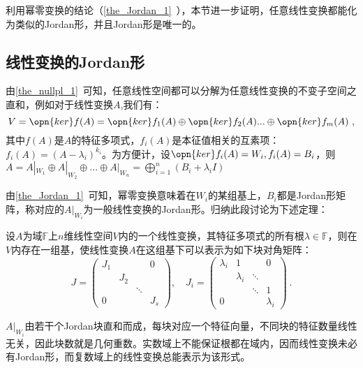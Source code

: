

\begin{issues}
\issueTODO
\end{issues}

利用幂零变换的结论（\autoref{the_Jordan_1}~），本节进一步证明，任意线性变换都能化为类似的Jordan形，并且Jordan形是唯一的。
\subsection{线性变换的Jordan形}
由\autoref{the_nullpl_1}~可知，任意线性空间都可以分解为任意线性变换的不变子空间之直和，例如对于线性变换$A$,我们有：
\begin{equation}
V=\opn{ker}f(A)=\opn{ker}f_1(A)\oplus\opn{ker}f_2(A)...\oplus\opn{ker}f_m(A)~,
\end{equation}
其中$f(A)$是$A$的特征多项式，$f_i(A)$是本征值相关的互素项：$f_i(A)=(A-\lambda_i)^{k_i}$。为方便计，设$\opn{ker}f_i(A)=W_i,f_i(A)=B_i$，则$A=A|_{W_1}\oplus A|_{W_2}\oplus...\oplus A|_{W_n}=\bigoplus^n_{i=1}(B_i+\lambda_iI)$

由\autoref{the_Jordan_1}~可知，幂零变换意味着在$W_i$的某组基上，$B_i$都是Jordan形矩阵，称对应的$A|_{W_i}$为一般线性变换的Jordan形。归纳此段讨论为下述定理：
\begin{theorem}{}\label{the_ltrJor_1}
设$A$为域$\mathbb F$上$n$维线性空间$V$内的一个线性变换，其特征多项式的所有根$\lambda\in\mathbb F$，则在$V$内存在一组基，使线性变换$A$在这组基下可以表示为如下块对角矩阵：
\begin{equation}
J=\left(\begin{array}{cccc}
J_1 & & & 0 \\
& J_2 & & \\
& & \ddots & \\
0 & & & J_s
\end{array}\right), \quad J_i=\left(\begin{array}{cccc}
\lambda_i & 1 & & 0 \\
& \lambda_i & \ddots & \\
& & \ddots & 1 \\
0 & & & \lambda_i
\end{array}\right)~.
\end{equation}
\end{theorem}
$A|_{W_i}$由若干个Jordan块直和而成，每块对应一个特征向量，不同块的特征数量线性无关，因此块数就是几何重数。实数域上不能保证根都在域内，因而线性变换未必有Jordan形，而复数域上的线性变换总能表示为该形式。

